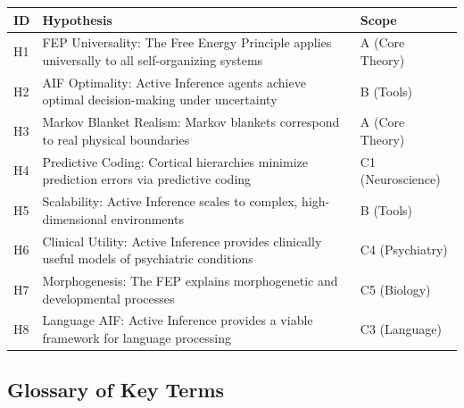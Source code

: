\documentclass[
]{article}
\newcounter{none} %
\begin{document}
{\def\LTcaptype{none} %
\begin{longtable}[]{@{}
  >{\raggedright\arraybackslash}p{}
  >{\raggedright\arraybackslash}p{}
  >{\raggedright\arraybackslash}p{}@{}}
\toprule\noalign{}
\begin{minipage}[b]{\linewidth}\raggedright
ID
\end{minipage} & \begin{minipage}[b]{\linewidth}\raggedright
Hypothesis
\end{minipage} & \begin{minipage}[b]{\linewidth}\raggedright
Scope
\end{minipage} \\
\midrule\noalign{}
\endhead
\bottomrule\noalign{}
\endlastfoot
H1 & FEP Universality: The Free Energy Principle applies universally to
all self-organizing systems & A (Core Theory) \\
H2 & AIF Optimality: Active Inference agents achieve optimal
decision-making under uncertainty & B (Tools) \\
H3 & Markov Blanket Realism: Markov blankets correspond to real physical
boundaries & A (Core Theory) \\
H4 & Predictive Coding: Cortical hierarchies minimize prediction errors
via predictive coding & C1 (Neuroscience) \\
H5 & Scalability: Active Inference scales to complex, high-dimensional
environments & B (Tools) \\
H6 & Clinical Utility: Active Inference provides clinically useful
models of psychiatric conditions & C4 (Psychiatry) \\
H7 & Morphogenesis: The FEP explains morphogenetic and developmental
processes & C5 (Biology) \\
H8 & Language AIF: Active Inference provides a viable framework for
language processing & C3 (Language) \\
\end{longtable}
}

\subsection{Glossary of Key Terms}\label{glossary-of-key-terms}
\end{document}
